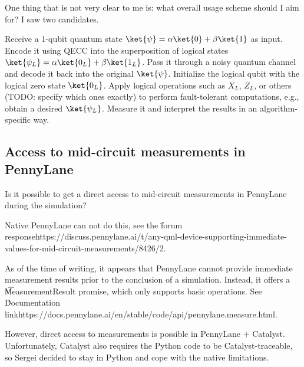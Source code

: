 \begin{QUESTION}
One thing that is not very clear to me is: what overall usage scheme should I aim for? I saw two
candidates.

\ls Receive a 1-qubit quantum state $\ket{\psi} = \alpha\ket{0} + \beta\ket{1}$ as input. Encode it
    using QECC into the superposition of logical states $\ket{\psi_L} = \alpha\ket{0_L} +
    \beta\ket{1_L}$. Pass it through a noisy quantum channel and decode it back into the original
    $\ket{\psi}$.
\li Initialize the logical qubit with the logical zero state $\ket{0_L}$. Apply logical operations
    such as $X_L$, $Z_L$, or others (TODO: specify which ones exactly) to perform fault-tolerant
    computations, e.g., obtain a desired $\ket{\psi_L}$. Measure it and interpret the results in an
    algorithm-specific way.
\le
\end{QUESTION}

\subsection{Access to mid-circuit measurements in PennyLane}

\begin{QUESTION}
Is it possible to get a direct access to mid-circuit measurements in PennyLane during the
simulation?
\end{QUESTION}

\vsp

Native PennyLane can not do this, see the
\u{forum response}{https://discuss.pennylane.ai/t/any-qml-device-supporting-immediate-values-for-mid-circuit-measurements/8426/2}.

As of the time of writing, it appears that PennyLane cannot provide immediate measurement results
prior to the conclusion of a simulation. Instead, it offers a \t{MeasurementResult} promise, which
only supports basic operations. See
\u{Documentation link}{https://docs.pennylane.ai/en/stable/code/api/pennylane.measure.html}.

However, direct access to measurements is possible in PennyLane + Catalyst. Unfortunately, Catalyst
also requires the Python code to be Catalyst-traceable, so Sergei decided to stay in Python and cope
with the native limitations.
